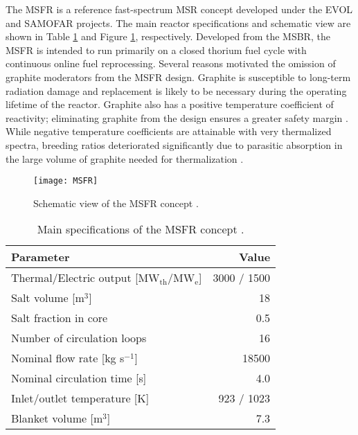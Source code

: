 The \gls{MSFR} is a reference fast-spectrum \gls{MSR} concept developed
under the \gls{EVOL} and \gls{SAMOFAR} projects. The main reactor
specifications and schematic view are shown in Table \ref{table:msfr} and
Figure \ref{fig:msfr}, respectively. Developed from the \gls{MSBR}, the
\gls{MSFR} is intended to run primarily on a closed thorium fuel cycle with
continuous online fuel reprocessing. Several reasons motivated the omission of
graphite moderators from the \gls{MSFR} design. Graphite is susceptible to
long-term radiation damage and replacement is likely to be necessary during
the operating lifetime of the reactor. Graphite also has a positive
temperature coefficient of reactivity; eliminating graphite from the design
ensures a greater safety margin \cite{mathieu_thorium_2006}. While negative
temperature coefficients are attainable with very thermalized spectra,
breeding ratios deteriorated significantly due to parasitic absorption in the
large volume of graphite needed for thermalization
\cite{mathieu_thorium_2006}.
%
\begin{figure}[htb!] 
	\centering
	\texttt{[image: MSFR]}
	\caption{Schematic view of the MSFR concept \cite{serp_molten_2014}.}
	\label{fig:msfr}
\end{figure}
%
\begin{table}[htb!]
    \small
	\caption{Main specifications of the \gls{MSFR} concept
				\cite{serp_molten_2014}.}
	\centering
	\begin{tabular}{ l r }
		\hline
		Parameter & Value \\
		\hline
		Thermal/Electric output [MW$_{\text{th}}$/MW$_{\text{e}}$] & 3000 /
		1500 
		\\
		Salt volume [m$^3$] & 18 \\
		Salt fraction in core & 0.5 \\
		Number of circulation loops & 16 \\
		Nominal flow rate [kg s$^{-1}$] & 18500  \\
		Nominal circulation time [s] & 4.0 \\
		Inlet/outlet temperature [K] & 923 / 1023 \\
		Blanket volume [m$^3$] & 7.3\\
		\hline
	\end{tabular}
	\label{table:msfr}
\end{table}


